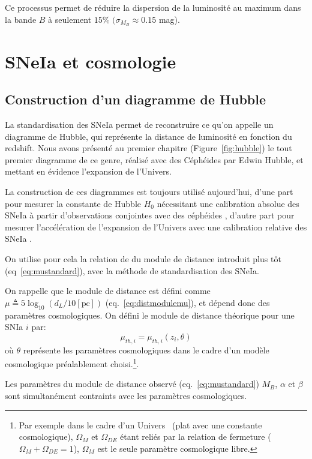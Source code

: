 \documentclass[../main/main.tex]{subfiles}
\begin{document}
Ce processus permet de réduire la dispersion de la luminosité au maximum
dans la bande $B$ à seulement $15\%$ $(\sigma_{M_{B}}\approx0.15$ mag).
\section{SNeIa et cosmologie}

\subsection{Construction d'un diagramme de Hubble}

La standardisation des SNeIa permet de reconstruire ce qu'on appelle un
diagramme de Hubble, qui représente la distance de luminosité en fonction
du redshift. Nous avons présenté au premier chapitre
(Figure~\ref{fig:hubble}) le tout premier diagramme de ce genre, réalisé
avec des Céphéides par Edwin Hubble, et mettant en évidence l'expansion
de l'Univers.

La construction de ces diagrammes est toujours utilisé aujourd'hui,
d'une part pour
mesurer la constante de Hubble $H_{0}$ nécessitant une calibration absolue des
SNeIa à partir d'observations conjointes avec des céphéides \citep{Riess2016}, d'autre
part pour mesurer l'accélération de l'expansion de l'Univers avec une
calibration relative des SNeIa \citep{Riess1998, Perlmutter1999,
  Betoule2014}.

On utilise pour cela la relation de \citet{Tripp1998} du module de
distance introduit plus tôt (eq~\ref{eq:mustandard}), avec la méthode de
standardisation des SNeIa. 

On rappelle que le module de distance est défini comme
$\mu\triangleq5\log_{10}(d_{L}/10[\text{pc}])$ (eq.~\ref{eq:distmodulemu}), et dépend donc des paramètres cosmologiques.
On défini le module de distance théorique pour une SNIa $i$ par:
\begin{equation}
  \label{eq:mutheo}
  \mu_{th,i} = \mu_{th,i}\left(z_{i}, \theta\right)
\end{equation}
où $\theta$
représente les paramètres cosmologiques dans le cadre d'un modèle cosmologique préalablement choisi.\footnote{Par exemple dans le cadre d'un
Univers \lcdm\ (plat avec une constante cosmologique),
$\Omega_{M}$ et $\Omega_{DE}$ étant reliés par la relation de
fermeture ($\Omega_{M}+\Omega_{DE}=1$), $\Omega_{M}$ est le seule paramètre cosmologique libre.}.

Les paramètres du module de distance
observé (eq.~\ref{eq:mustandard}) $M_{B}$, $\alpha$ et
$\beta$ sont simultanément contraints avec les paramètres cosmologiques.
\end{document}
